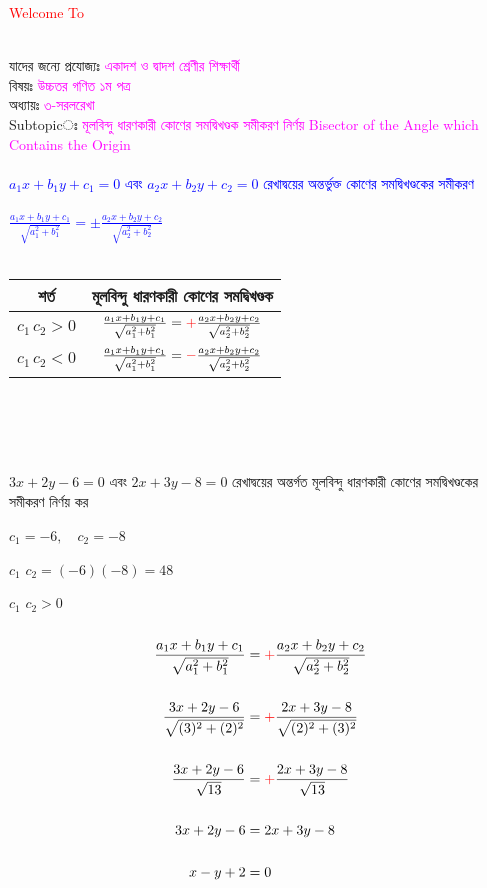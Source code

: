 \documentclass{article}
\begin{document}
 
	\Large
	\textcolor{red}{Welcome To} 
	\\
	\\
	যাদের জন্যে প্রযোজ্যঃ  	\textcolor{magenta}{একাদশ ও দ্বাদশ শ্রেণীর শিক্ষার্থী} \\
	বিষয়ঃ \textcolor{magenta}{উচ্চতর গণিত ১ম পত্র} \\
	অধ্যায়ঃ \textcolor{magenta}{৩-সরলরেখা}\\ 
	Subtopicঃ  \textcolor{magenta}{  মূলবিন্দু ধারণকারী কোণের সমদ্বিখণ্ডক সমীকরণ নির্ণয় Bisector of the Angle which Contains the Origin}\\
	\\
	\textcolor{blue}{$a_1x+b_1y+c_1=0$ এবং $a_2x+b_2y+c_2=0$ রেখাদ্বয়ের অন্তর্ভুক্ত  কোণের সমদ্বিখণ্ডকের সমীকরণ \\
		\\
		$\frac{a_1x+b_1y+c_1}{\sqrt{a_1^2+b_1^2}}=\pm \frac{a_2x+b_2y+c_2}{\sqrt{a_2^2+b_2^2}}$}\\
	\\
	\begin{tabular}{|c|c|}
		\hline 
		শর্ত	& মূলবিন্দু ধারণকারী কোণের সমদ্বিখণ্ডক  \\ 
		\hline  
		$c_1\,c_2>0$	& $\frac{a_1x+b_1y+c_1}{\sqrt{a_1^2+b_1^2}}=\textcolor{red}{+} \frac{a_2x+b_2y+c_2}{\sqrt{a_2^2+b_2^2}}$\\
		\hline 
		$c_1\,c_2<0$	& $\frac{a_1x+b_1y+c_1}{\sqrt{a_1^2+b_1^2}}=\textcolor{red}{-} \frac{a_2x+b_2y+c_2}{\sqrt{a_2^2+b_2^2}}$\\
		\hline 
	\end{tabular}\\
	\\ 
\\
\\
	$3x+2y-6=0$ এবং $2x+3y-8=0$ রেখাদ্বয়ের অন্তর্গত  মূলবিন্দু ধারণকারী কোণের সমদ্বিখণ্ডকের সমীকরণ নির্ণয় কর  \\
\\
$c_1=-6,\quad c_2=-8$\\
\\
$c_1\,\,c_2=(-6)(-8)=48$\\
\\
$c_1\,\,c_2>0$\\ 
\\
	\begin{align*}
		\frac{a_1x+b_1y+c_1}{\sqrt{a_1^2+b_1^2}}&=\textcolor{red}{+} \frac{a_2x+b_2y+c_2}{\sqrt{a_2^2+b_2^2}}\\
		\\
		\frac{3x+2y-6}{\sqrt{(3)^2+(2)^2}}&=\textcolor{red}{+} \frac{2x+3y-8}{\sqrt{(2)^2+(3)^2}}\\
		\\
		\frac{3x+2y-6}{\sqrt{13}}&=\textcolor{red}{+} \frac{2x+3y-8}{\sqrt{13}}\\
		\\
	3x+2y-6&=2x+3y-8\\
		\\
		x-y+2&=0\\
	\end{align*}
\end{document}
